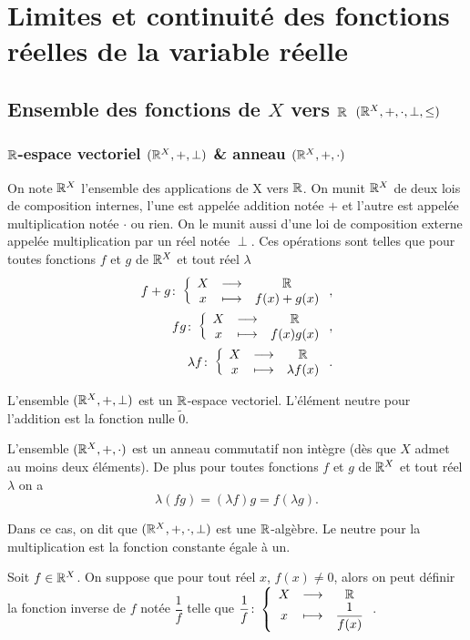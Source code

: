 \chapter{Limites et continuité des fonctions réelles de la variable réelle} 
\minitoc
\minilof
\minilot
\section[Ensemble des fonctions de $X$ vers $\R$]{Ensemble des fonctions de $X$ vers $\R$ $(\mathbb{R}^X, +, \cdot, \perp,\leq)$}

\subsection{$\R$-espace vectoriel $(\mathbb{R}^X, +, \perp)$ \& anneau $(\mathbb{R}^X, +, \cdot)$ }

On note $\mathbb{R}^X$ l'ensemble des applications de X vers $\R$. On munit $\mathbb{R}^X$ de deux lois de composition internes, l'une est  appelée addition notée $+$ et l'autre est appelée multiplication notée $\cdot$ ou rien. On le munit aussi d'une loi de composition externe appelée multiplication par un réel notée $\perp$. Ces opérations sont telles que pour toutes fonctions $f$ et $g$ de $\mathbb{R}^X$ et tout réel $\lambda$
\begin{align}
  f+g\colon \left\{\begin{array}{ccc} X & \longrightarrow &\mathbb{R}\\ x & \longmapsto & f(x)+g(x) \end{array} \right., \\
  fg\colon \left\{\begin{array}{ccc} X & \longrightarrow &\mathbb{R}\\ x & \longmapsto & f(x)g(x) \end{array} \right., \\
  \lambda f\colon \left\{\begin{array}{ccc} X & \longrightarrow &\mathbb{R}\\ x & \longmapsto & \lambda f(x) \end{array} \right..
\end{align}
\begin{prop}
  L'ensemble $(\mathbb{R}^X, +, \perp)$ est un $\R$-espace vectoriel. L'élément neutre pour l'addition est la fonction nulle $\tilde{0}$.
\end{prop}
\begin{prop}
  L'ensemble $(\mathbb{R}^X, +, \cdot)$ est un anneau commutatif non intègre (dès que $X$ admet au moins deux éléments). De plus pour toutes fonctions $f$ et $g$ de $\mathbb{R}^X$ et tout réel $\lambda$ on a
  \begin{equation}
    \lambda(fg)=(\lambda f)g=f(\lambda g).
  \end{equation}
\end{prop}
Dans ce cas, on dit que $(\mathbb{R}^X,+,\cdot,\perp)$ est une $\R$-algèbre. Le neutre pour la multiplication est la fonction constante égale à un.
 \begin{defdef}
   Soit $f \in \mathbb{R}^X$. On suppose que pour tout réel $x$, $f(x)\neq 0$, alors on peut définir la fonction inverse de $f$ notée $\dfrac{1}{f}$ telle que $\dfrac{1}{f}\colon \left\{\begin{array}{ccc} X & \longrightarrow &\mathbb{R}\\ x & \longmapsto & \dfrac{1}{f(x)} \end{array} \right.$.
 \end{defdef}

